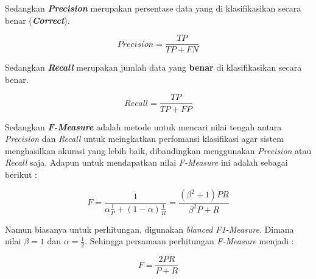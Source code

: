 \documentclass[../Proposal.tex]{subfiles}
\begin{document}
	
	\noindent Sedangkan \textbf{\textit{Precision}} merupakan persentase data yang di klasifikasikan secara benar (\textbf{\textit{Correct}}). 
	
	\begin{center}
		\centering
		\begin{equation}
		Precision = \frac{TP}{TP + FN}
		\end{equation}
	\end{center}
	
	\noindent Sedangkan \textbf{\textit{Recall}} merupakan jumlah data yang \textbf{benar} di klasifikasikan secara benar.
	
	\begin{center}
		\centering
		\begin{equation}
		Recall = \frac{TP}{TP + FP}
		\end{equation}
	\end{center}
	
	\noindent Sedangkan \textbf{\textit{F-Measure}} adalah metode untuk mencari nilai tengah antara \textit{Precision} dan \textit{Recall} untuk meingkatkan perfomansi klasifikasi agar sistem menghasilkan akurasi yang lebih baik, dibandingkan menggunakan \textit{Precision} atau \textit{Recall} saja. Adapun untuk mendapatkan nilai \textit{F-Measure} ini adalah sebagai berikut :
	
	\begin{center}
		\centering
		\begin{equation}
		F = \frac{1}{\alpha \frac{1}{P} + (1-\alpha) \frac{1}{R}} = \frac{(\beta^2 + 1)PR}{\beta^2P+R}
		\end{equation}
	\end{center}
	
	\noindent Namun biasanya untuk perhitungan, digunakan \textit{blanced F1-Measure}. Dimana nilai \begin{math}\beta = 1\end{math} dan \begin{math}\alpha = \frac{1}{2}\end{math}. Sehingga persamaan perhitungan \textit{F-Measure} menjadi : 
	
	\begin{center}
		\centering
		\begin{equation}
		F = \frac{2PR}{P+R}
		\end{equation}
	\end{center}
\end{document}
